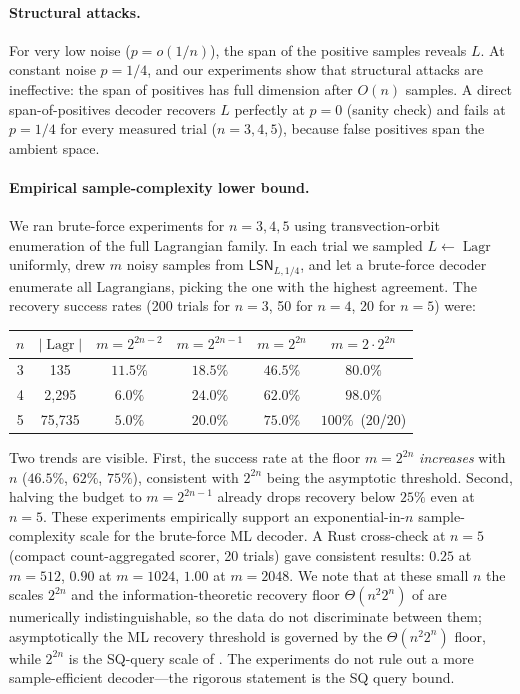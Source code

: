 \documentclass[11pt,a4paper]{article}
\theoremstyle{plain}
\theoremstyle{definition}
\DeclareMathOperator{\Lagr}{Lagr}
\newcommand{\LSN}{\mathsf{LSN}}
\begin{document}
\paragraph{Structural attacks.}
For very low noise ($p = o(1/n)$), the span of the positive samples reveals $L$. At constant noise $p=1/4$, \cite{LPQR26} and our experiments show that structural attacks are ineffective: the span of positives has full dimension after $O(n)$ samples.  A direct span-of-positives decoder recovers $L$ perfectly at $p=0$ (sanity check) and fails at $p=1/4$ for every measured trial ($n=3,4,5$), because false positives span the ambient space.

\paragraph{Empirical sample-complexity lower bound.}
We ran brute-force experiments for $n=3,4,5$ using transvection-orbit enumeration of the full Lagrangian family.  In each trial we sampled $L\leftarrow\Lagr$ uniformly, drew $m$ noisy samples from $\LSN_{L,1/4}$, and let a brute-force decoder enumerate all Lagrangians, picking the one with the highest agreement.  The recovery success rates (200 trials for $n=3$, 50 for $n=4$, 20 for $n=5$) were:
\begin{center}
\begin{tabular}{@{}cccccc@{}}
\toprule
$n$ & $|\Lagr|$ & $m=2^{2n-2}$ & $m=2^{2n-1}$ & $m=2^{2n}$ & $m=2\cdot2^{2n}$ \\
\midrule
3 & 135 & $11.5\%$ & $18.5\%$ & $46.5\%$ & $80.0\%$ \\
4 & 2{,}295 & $6.0\%$ & $24.0\%$ & $62.0\%$ & $98.0\%$ \\
5 & 75{,}735 & $5.0\%$ & $20.0\%$ & $75.0\%$ & $100\%$~(20/20) \\
\bottomrule
\end{tabular}
\end{center}
Two trends are visible.  First, the success rate at the floor $m=2^{2n}$ \emph{increases} with $n$ ($46.5\%$, $62\%$, $75\%$), consistent with $2^{2n}$ being the asymptotic threshold.  Second, halving the budget to $m=2^{2n-1}$ already drops recovery below $25\%$ even at $n=5$.  These experiments empirically support an exponential-in-$n$ sample-complexity scale for the brute-force ML decoder.  A Rust cross-check at $n=5$ (compact count-aggregated scorer, 20 trials) gave consistent results: $0.25$ at $m=512$, $0.90$ at $m=1024$, $1.00$ at $m=2048$.  We note that at these small $n$ the scales $2^{2n}$ and the information-theoretic recovery floor $\Theta(n^2 2^n)$ of  are numerically indistinguishable, so the data do not discriminate between them; asymptotically the ML recovery threshold is governed by the $\Theta(n^2 2^n)$ floor, while $2^{2n}$ is the SQ-query scale of . The experiments do not rule out a more sample-efficient decoder---the rigorous statement is the SQ query bound.
\end{document}
